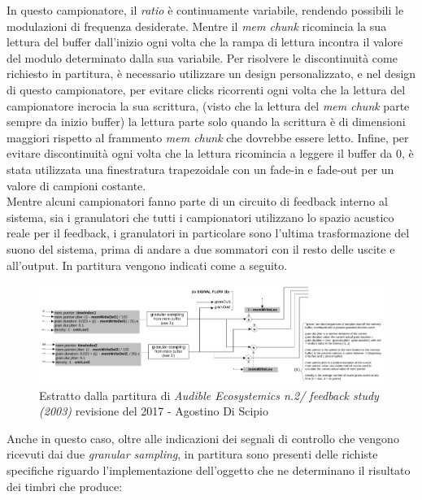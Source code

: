 In questo campionatore, il \textit{ratio} è continuamente variabile, 
rendendo possibili le modulazioni di frequenza desiderate. 
Mentre il \textit{mem chunk} ricomincia la sua lettura del buffer dall'inizio 
ogni volta che la rampa di lettura incontra il valore del modulo determinato dalla sua variabile.
Per risolvere le discontinuità come richiesto in partitura, 
è necessario utilizzare un design personalizzato,
e nel design di questo campionatore, 
per evitare clicks ricorrenti ogni volta che la lettura del campionatore incrocia la sua scrittura, 
(visto che la lettura del \textit{mem chunk} parte sempre da inizio buffer)
la lettura parte solo quando la scrittura è di dimensioni maggiori rispetto al frammento \textit{mem chunk} 
che dovrebbe essere letto.
Infine, per evitare discontinuità ogni volta che la lettura ricomincia a leggere il buffer da 0, 
è stata utilizzata una finestratura trapezoidale con un fade-in e fade-out 
per un valore di campioni costante. \\
Mentre alcuni campionatori fanno parte di un circuito di feedback interno al sistema, 
sia i granulatori che tutti i campionatori utilizzano lo spazio acustico reale per il feedback,
i granulatori in particolare sono l'ultima trasformazione del suono del sistema, prima di andare a 
due sommatori con il resto delle uscite e all'output.
In partitura vengono indicati come a seguito.
\clearpage

\begin{figure}[h!]
\begin{center}
    \includegraphics[width=14cm]{figures/GRANULATORSFeedbackstudy2017.pdf}
    \caption{Estratto dalla partitura di \textit{Audible Ecosystemics n.2/ feedback study (2003)}
    revisione del 2017 - Agostino Di Scipio}
    \vspace{0.5cm}
\end{center}
\end{figure}

Anche in questo caso, oltre alle indicazioni dei segnali di controllo che vengono
ricevuti dai due \textit{granular sampling}, 
in partitura sono presenti delle richiste specifiche riguardo l'implementazione 
dell'oggetto che ne determinano il risultato dei timbri che produce: 

